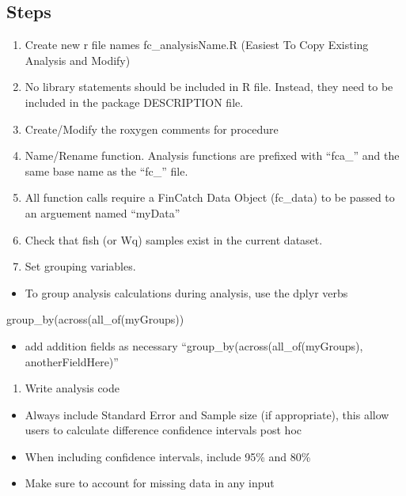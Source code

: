 \documentclass[
  letterpaper,
  DIV=11,
  numbers=noendperiod]{scrreprt}
\newenvironment{Shaded}{\begin{snugshade}}{\end{snugshade}}
\newcommand{\FunctionTok}[1]{\textcolor[rgb]{0.28,0.35,0.67}{#1}}
\newcommand{\NormalTok}[1]{\textcolor[rgb]{0.00,0.23,0.31}{#1}}
\providecommand{\tightlist}{%
  \setlength{\itemsep}{0pt}\setlength{\parskip}{0pt}}\usepackage{longtable,booktabs,array}
\begin{document}
\subsection{Steps}\label{steps}

\begin{enumerate}
\def\labelenumi{\arabic{enumi}.}
\item
  Create new r file names fc\_analysisName.R (Easiest To Copy Existing
  Analysis and Modify)
\item
  No library statements should be included in R file. Instead, they need
  to be included in the package DESCRIPTION file.
\item
  Create/Modify the roxygen comments for procedure
\item
  Name/Rename function. Analysis functions are prefixed with ``fca\_''
  and the same base name as the ``fc\_'' file.
\item
  All function calls require a FinCatch Data Object (fc\_data) to be
  passed to an arguement named ``myData''
\item
  Check that fish (or Wq) samples exist in the current dataset.
\item
  Set grouping variables.
\end{enumerate}

\begin{itemize}
\tightlist
\item
  To group analysis calculations during analysis, use the dplyr verbs
\end{itemize}

\begin{Shaded}
\begin{Highlighting}[]
        \FunctionTok{group\_by}\NormalTok{(}\FunctionTok{across}\NormalTok{(}\FunctionTok{all\_of}\NormalTok{(myGroups))}
\end{Highlighting}
\end{Shaded}

\begin{itemize}
\tightlist
\item
  add addition fields as necessary ``group\_by(across(all\_of(myGroups),
  anotherFieldHere)''
\end{itemize}

\begin{enumerate}
\def\labelenumi{\arabic{enumi}.}
\setcounter{enumi}{7}
\tightlist
\item
  Write analysis code
\end{enumerate}

\begin{itemize}
\item
  Always include Standard Error and Sample size (if appropriate), this
  allow users to calculate difference confidence intervals post hoc
\item
  When including confidence intervals, include 95\% and 80\%
\item
  Make sure to account for missing data in any input
\end{itemize}
\end{document}
